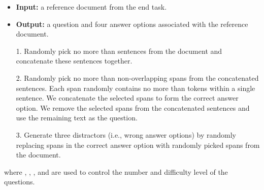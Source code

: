 \documentclass[11pt,a4paper]{article}
\newcommand{\ie}{{i.e.}}
\begin{document}
\vspace{-\topsep}
\begin{itemize}
\setlength\itemsep{-0.25em}
\item \textbf{Input:}  a reference document from the end task.
    \item \textbf{Output:} a question and four answer options associated with the reference document.
    \item[1.] Randomly pick no more than  sentences from the document and concatenate these sentences together.
    \item[2.] Randomly pick no more than  non-overlapping spans from the concatenated sentences. Each span randomly contains no more than  tokens within a single sentence. We concatenate the selected spans to form the correct answer option. We remove the selected spans from the concatenated sentences and use the remaining text as the question.
    \item[3.] Generate three distractors (\ie, wrong answer options) by randomly replacing spans in the correct answer option with randomly picked spans from the document.
\end{itemize}
\vspace{-\topsep}
where , , , and  are used to control the number and difficulty level of the questions.
\end{document}
